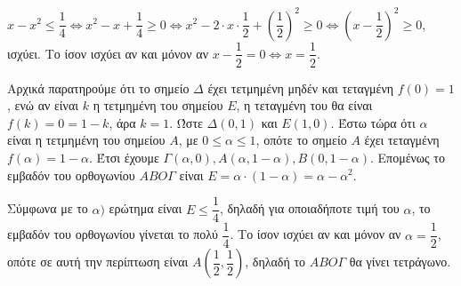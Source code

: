 
\begin{alist}
\item $x - x^2 \le \dfrac{1}{4} \Leftrightarrow x^2 - x + \dfrac{1}{4} \ge 0 \Leftrightarrow x^2 - 2 \cdot x \cdot \dfrac{1}{2} + \left(\dfrac{1}{2}\right)^2 \ge 0 \Leftrightarrow \left(x - \dfrac{1}{2}\right)^2 \ge 0$, ισχύει.
Το ίσον ισχύει αν και μόνον αν $x - \dfrac{1}{2} = 0 \Leftrightarrow x = \dfrac{1}{2}$.

\item 
\begin{rlist}
\item Αρχικά παρατηρούμε ότι το σημείο $\Delta$ έχει τετμημένη μηδέν και τεταγμένη $f(0) = 1$,
ενώ αν είναι $k$ η τετμημένη του σημείου $E$, η τεταγμένη του θα είναι $f(k) = 0 = 1 - k$, άρα $k = 1$. Ώστε $\Delta(0, 1)$ και $E(1, 0)$.
Έστω τώρα ότι $\alpha$ είναι η τετμημένη του σημείου $A$, με $0 \le \alpha \le 1$, οπότε το σημείο $A$
έχει τεταγμένη $f(\alpha) = 1 - \alpha$.
Έτσι έχουμε $\Gamma(\alpha, 0), A(\alpha, 1 - \alpha), B(0, 1 - \alpha)$.
Επομένως το εμβαδόν του ορθογωνίου $ABO\Gamma$ είναι $E = \alpha \cdot (1 - \alpha) = \alpha - \alpha^2$.

\item Σύμφωνα με το $\alpha)$ ερώτημα είναι $E \le \dfrac{1}{4}$, δηλαδή για οποιαδήποτε τιμή του $\alpha$, το
εμβαδόν του ορθογωνίου γίνεται το πολύ $\dfrac{1}{4}$. Το ίσον ισχύει αν και μόνον αν $\alpha = \dfrac{1}{2}$,
οπότε σε αυτή την περίπτωση είναι $A\left(\dfrac{1}{2}, \dfrac{1}{2}\right)$, δηλαδή το $ABO\Gamma$ θα γίνει τετράγωνο.
\end{rlist}
\end{alist}

